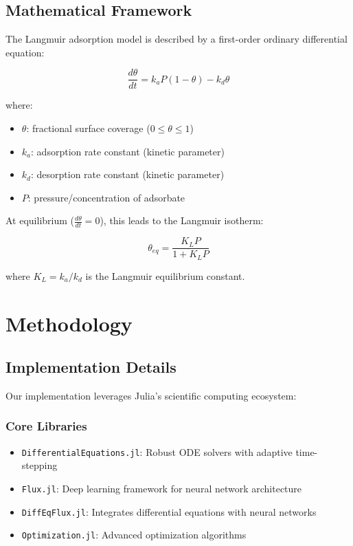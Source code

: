 \documentclass[12pt]{article}
\begin{document}
\subsection{Mathematical Framework}
The Langmuir adsorption model is described by a first-order ordinary differential equation:

\begin{equation}
    \frac{d\theta}{dt} = k_a P (1-\theta) - k_d \theta
\end{equation}

where:
\begin{itemize}
    \item $\theta$: fractional surface coverage ($0 \leq \theta \leq 1$)
    \item $k_a$: adsorption rate constant (kinetic parameter)
    \item $k_d$: desorption rate constant (kinetic parameter)
    \item $P$: pressure/concentration of adsorbate
\end{itemize}

At equilibrium ($\frac{d\theta}{dt} = 0$), this leads to the Langmuir isotherm:

\begin{equation}
    \theta_{eq} = \frac{K_L P}{1 + K_L P}
\end{equation}

where $K_L = k_a/k_d$ is the Langmuir equilibrium constant.

\section{Methodology}

\subsection{Implementation Details}
Our implementation leverages Julia's scientific computing ecosystem:

\subsubsection{Core Libraries}
\begin{itemize}
    \item \texttt{DifferentialEquations.jl}: Robust ODE solvers with adaptive time-stepping
    \item \texttt{Flux.jl}: Deep learning framework for neural network architecture
    \item \texttt{DiffEqFlux.jl}: Integrates differential equations with neural networks
    \item \texttt{Optimization.jl}: Advanced optimization algorithms
\end{itemize}
\end{document}
